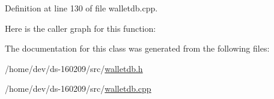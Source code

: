 Definition at line 130 of file walletdb.\+cpp.



Here is the caller graph for this function\+:




The documentation for this class was generated from the following files\+:\begin{DoxyCompactItemize}
\item 
/home/dev/ds-\/160209/src/\hyperlink{walletdb_8h}{walletdb.\+h}\item 
/home/dev/ds-\/160209/src/\hyperlink{walletdb_8cpp}{walletdb.\+cpp}\end{DoxyCompactItemize}
